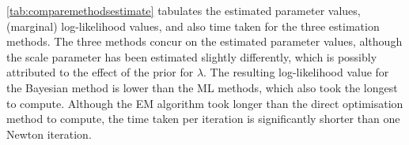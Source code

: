 \cref{tab:comparemethodsestimate} tabulates the estimated parameter values, (marginal) log-likelihood values, and also time taken for the three estimation methods.
The three methods concur on the estimated parameter values, although the scale parameter has been estimated slightly differently, which is possibly attributed to the effect of the prior for $\lambda$.
The resulting log-likelihood value for the Bayesian method is lower than the ML methods, which also took the longest to compute.
Although the EM algorithm took longer than the direct optimisation method to compute, the time taken per iteration is significantly shorter than one Newton iteration.

